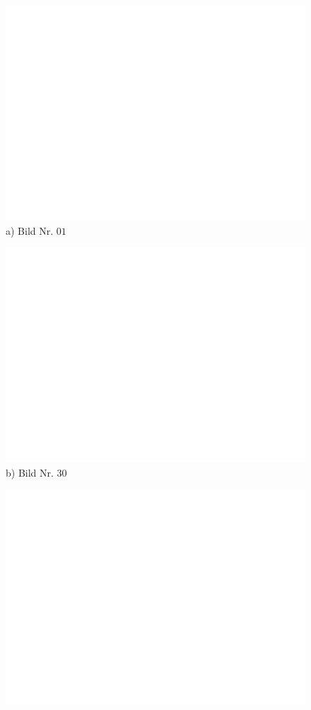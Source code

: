 \begin{figure}[H]
\centering
  \begin{minipage}{0.3\textwidth}
    \includegraphics[width=\textwidth]{images/dummy.png}
    a) Bild Nr. $01$
    \label{frame01}
  \end{minipage}
  \begin{minipage}{0.3\textwidth}
    \includegraphics[width=\textwidth]{images/dummy.png}
    b) Bild Nr. $30$
    \label{frame30}
  \end{minipage}
   \begin{minipage}{0.3\textwidth}
    \includegraphics[width=\textwidth]{images/dummy.png}

\end{minipage}
\end{figure}
